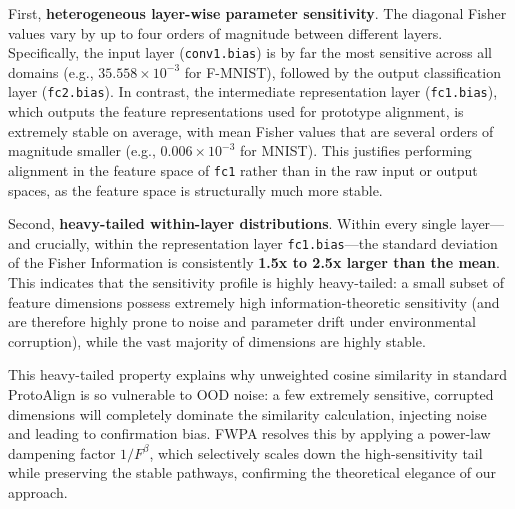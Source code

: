 \documentclass{article}
\theoremstyle{plain}
\theoremstyle{definition}
\theoremstyle{remark}
\begin{document}
First, \textbf{heterogeneous layer-wise parameter sensitivity}. The diagonal Fisher values vary by up to four orders of magnitude between different layers. Specifically, the input layer (\texttt{conv1.bias}) is by far the most sensitive across all domains (e.g., $35.558 \times 10^{-3}$ for F-MNIST), followed by the output classification layer (\texttt{fc2.bias}). In contrast, the intermediate representation layer (\texttt{fc1.bias}), which outputs the feature representations used for prototype alignment, is extremely stable on average, with mean Fisher values that are several orders of magnitude smaller (e.g., $0.006 \times 10^{-3}$ for MNIST). This justifies performing alignment in the feature space of \texttt{fc1} rather than in the raw input or output spaces, as the feature space is structurally much more stable.

Second, \textbf{heavy-tailed within-layer distributions}. Within every single layer—and crucially, within the representation layer \texttt{fc1.bias}—the standard deviation of the Fisher Information is consistently \textbf{1.5x to 2.5x larger than the mean}. This indicates that the sensitivity profile is highly heavy-tailed: a small subset of feature dimensions possess extremely high information-theoretic sensitivity (and are therefore highly prone to noise and parameter drift under environmental corruption), while the vast majority of dimensions are highly stable. 

This heavy-tailed property explains why unweighted cosine similarity in standard ProtoAlign is so vulnerable to OOD noise: a few extremely sensitive, corrupted dimensions will completely dominate the similarity calculation, injecting noise and leading to confirmation bias. FWPA resolves this by applying a power-law dampening factor $1/F^\beta$, which selectively scales down the high-sensitivity tail while preserving the stable pathways, confirming the theoretical elegance of our approach.
\end{document}
